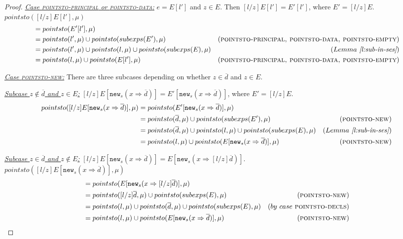 \documentclass{llncs}
\newcommand{\keywadj}[1]{\mathtt{#1}}
\begin{document}
\begin{proof}
\noindent\underline{\textit{Case \textsc{pointsto-principal} or \textsc{pointsto-data}:}} $e = E[l']$ and $z \in E$. Then $[l / z]E[l'] = E'[l']$, where \mbox{$E' = [l / z]E$}.\\
$pointsto([l / z]E[l'], \mu)$
\vspace{-7pt}
\begin{align*}
&= pointsto(E'[l'], \mu)\\
&= pointsto(l', \mu) \cup pointsto(subexps(E'), \mu) & (\textsc{pointsto-principal, pointsto-data, pointsto-empty})\\
&= pointsto(l', \mu) \cup pointsto(l, \mu) \cup pointsto(subexps(E), \mu) & (Lemma~\textit{\ref{l:sub-in-ses}})\\
&= pointsto(l, \mu) \cup pointsto(E[l'], \mu) & (\textsc{pointsto-principal, pointsto-data, pointsto-empty})
\end{align*}

\noindent\underline{\textit{Case \textsc{pointsto-new}:}} There are three subcases depending on whether $z \in \overline{d}$ and $z \in E$.

\noindent\underline{\textit{Subcase $z \not\in \overline{d}$ and $z \in E$:}} $[l / z]E[\keywadj{new}_s(x \Rightarrow \overline{d})] = E'[\keywadj{new}_s(x \Rightarrow \overline{d})]$, where $E' = [l / z]E$.
\begin{align*}
pointsto([l / z]E[\keywadj{new}_s(x \Rightarrow \overline{d})], \mu) &= pointsto(E'[\keywadj{new}_s(x \Rightarrow \overline{d})], \mu)\\
&= pointsto(\overline{d}, \mu) \cup pointsto(subexps(E'), \mu) & (\textsc{pointsto-new})\\
&= pointsto(\overline{d}, \mu) \cup pointsto(l, \mu) \cup pointsto(subexps(E), \mu) & (Lemma~\textit{\ref{l:sub-in-ses}})\\
&= pointsto(l, \mu) \cup pointsto(E[\keywadj{new}_s(x \Rightarrow \overline{d})], \mu) & (\textsc{pointsto-new})
\end{align*}

\noindent\underline{\textit{Subcase $z \in \overline{d}$ and $z \not\in E$:}} $[l / z]E[\keywadj{new}_s(x \Rightarrow \overline{d})] = E[\keywadj{new}_s(x \Rightarrow [l / z]\overline{d})]$.\\
$pointsto([l / z]E[\keywadj{new}_s(x \Rightarrow \overline{d})], \mu)$
\vspace{-7pt}
\begin{align*}
&= pointsto(E[\keywadj{new}_s(x \Rightarrow [l / z]\overline{d})], \mu)\\
&= pointsto([l / z]\overline{d}, \mu) \cup pointsto(subexps(E), \mu) & (\textsc{pointsto-new})\\
&= pointsto(l, \mu) \cup pointsto(\overline{d}, \mu) \cup pointsto(subexps(E), \mu) & (by~case~\textsc{pointsto-decls})\\
&= pointsto(l, \mu) \cup pointsto(E[\keywadj{new}_s(x \Rightarrow \overline{d})], \mu) & (\textsc{pointsto-new})
\end{align*}


\end{proof}
\end{document}
